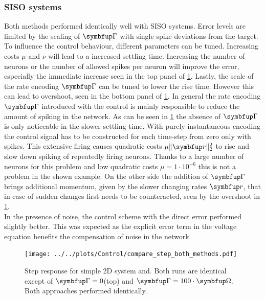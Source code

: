 \subsubsection{\ac{SISO} systems}
Both methods performed identically well with \ac{SISO} systems. Error levels are limited by the scaling of $\bmu{\Gamma}$ with single spike deviations from the target.\\
To influence the control behaviour, different parameters can be tuned. Increasing costs $\mu$ and $\nu$ will lead to a increased settling time. Increasing the number of neurons or the number of allowed spikes per neuron will improve the error, especially the immediate increase seen in the top panel of \cref{fig:step_compare}. Lastly, the scale of the rate encoding $\bmu{\Gamma}$ can be tuned to lower the rise time. However this can lead to overshoot, seen in the bottom panel of \cref{fig:step_compare}. In general the rate encoding $\bmu{\Gamma}$ introduced with the control is mainly responsible to reduce the amount of spiking in the network. As can be seen in \cref{fig:step_compare} the absence of $\bmu{\Gamma}$ is only noticeable in the slower settling time. With purely instantaneous encoding the control signal has to be constructed for each time-step from zero only with spikes. This extensive firing causes quadratic costs $\mu\|\bmu{r}\|^2_2$ to rise and slow down spiking of repeatedly firing neurons. Thanks to a large number of neurons for this problem and low quadratic costs $\mu = 1\cdot10^{-6}$ this is not a problem in the shown example. On the other side the addition of $\bmu{\Gamma}$ brings additional momentum, given by the slower changing rates $\bmu{r}$, that in case of sudden changes first needs to be counteracted, seen by the overshoot in \cref{fig:step_compare}.\\
In the presence of noise, the control scheme with the direct error performed slightly better. This was expected as the explicit error term in the voltage equation benefits the compensation of noise in the network.
\begin{figure}
	\centering
	\texttt{[image: ../../plots/Control/compare\_step\_both\_methods.pdf]}
	\caption{Step response for simple 2D system and. Both runs are identical except of $\bmu{\Gamma} = 0$(top) and $\bmu{\Gamma} = 100\cdot\bmu{\Omega}$. Both approaches performed identically.}
	\label{fig:step_compare}
\end{figure}



